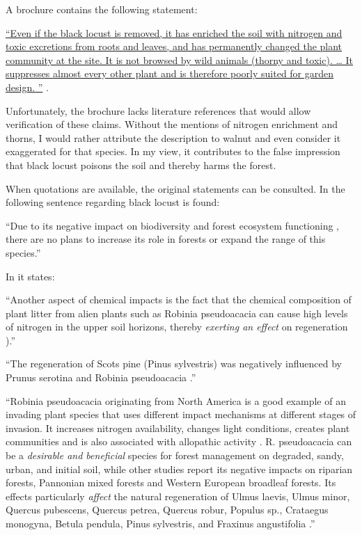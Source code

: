 A brochure contains the following statement:

\hyperlink{german:oebf2019aliensAusDemGarten}{\enquote{Even if the black locust is removed, it has enriched the soil with nitrogen and toxic excretions from roots and leaves, and has permanently changed the plant community at the site. It is not browsed by wild animals (thorny and toxic). \dots
  It suppresses almost every other plant and is therefore poorly suited for garden design.%
}} \citep[own translation]{oebf2019aliensAusDemGarten}.

Unfortunately, the brochure lacks literature references that would allow verification
of these claims. Without the mentions of nitrogen enrichment and thorns,
I would rather attribute the description to walnut and even consider it exaggerated for that species.
In my view, it contributes to the false impression that black locust poisons the soil
and thereby harms the forest.

When quotations are available, the original statements can be consulted.
In \citet{szyp2023robinieGenetik} the following sentence regarding black locust is found:

\enquote{Due to its negative impact on biodiversity and forest
  ecosystem functioning \citep{langmaier2020alienPlants}, there are no
  plans to increase its role in forests or expand the range of this
  species.}

In \citep{langmaier2020alienPlants} it states:

\enquote{Another aspect of chemical impacts is the fact that the
  chemical composition of plant litter from alien plants such as
  Robinia pseudoacacia can cause high levels of nitrogen in the upper
  soil horizons, thereby \emph{exerting an effect} on regeneration
  \citep{rahmonov2009robinieLitter}).}

\enquote{The regeneration of Scots pine (Pinus sylvestris) was
  negatively influenced by Prunus serotina and Robinia pseudoacacia
  \citep{sebert2007invasive,rahmonov2009robinieLitter}.}

\enquote{Robinia pseudoacacia originating from North America is a good
  example of an invading plant species that uses different impact
  mechanisms at different stages of invasion. It increases nitrogen
  availability, changes light conditions, creates plant communities
  and is also associated with allopathic activity
  \citep{rahmonov2009robinieLitter,campagnaro2018alien}.
  R. pseudoacacia can be a \emph{desirable and beneficial} species for forest
  management on degraded, sandy, urban, and initial soil, while other
  studies report its negative impacts on riparian forests, Pannonian
  mixed forests and Western European broadleaf forests. Its effects
  particularly \emph{affect} the natural regeneration of Ulmus laevis,
  Ulmus minor, Quercus pubescens, Quercus petrea, Quercus robur,
  Populus sp., Crataegus monogyna, Betula pendula, Pinus sylvestris,
  and Fraxinus angustifolia
  \citep{rahmonov2009robinieLitter,maringer2012robinePostFire,petrasova2013neophyten,radtke2013robinieNiederwald,terwei2013nonNative}.}

